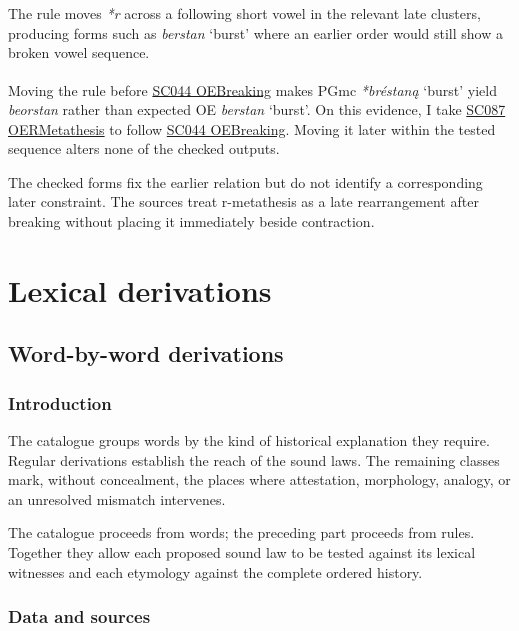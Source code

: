 \documentclass[
  british,
  a4paper,
  openany]{book}
\newcounter{none} %
\providecommand{\Pred}[1]{\textsuperscript{\dag}\emph{#1}}
\providecommand{\Recon}[1]{\emph{*#1}}
{\catcode`→=\active \global\def→{\ensuremath{\rightarrow}}}
\providecommand{\Pred}[1]{\textsuperscript{\dag}\emph{#1}}
\providecommand{\Recon}[1]{\emph{*#1}}
{\catcode`→=\active \global\def→{\ensuremath{\rightarrow}}}
\begin{document}
The rule moves \emph{*r} across a following short vowel in the relevant
late clusters, producing forms such as \emph{berstan} `burst' where an
earlier order would still show a broken vowel sequence.

Moving the rule before \hyperref[rule-OEBreaking]{SC044 OEBreaking}
makes PGmc \Recon{bréstaną} `burst' yield \Pred{beorstan} rather than
expected OE \emph{berstan} `burst'. On this evidence, I take
\hyperref[rule-OERMetathesis]{SC087 OERMetathesis} to follow
\hyperref[rule-OEBreaking]{SC044 OEBreaking}. Moving it later within the
tested sequence alters none of the checked outputs.

The checked forms fix the earlier relation but do not identify a
corresponding later constraint. The sources treat r-metathesis as a late
rearrangement after breaking without placing it immediately beside
contraction.

\newpage

\part{Lexical derivations}

\chapter*{Word-by-word derivations}\label{word-by-word-derivations}

\section*{Introduction}\label{introduction-1}

The catalogue groups words by the kind of historical explanation they
require. Regular derivations establish the reach of the sound laws. The
remaining classes mark, without concealment, the places where
attestation, morphology, analogy, or an unresolved mismatch intervenes.

The catalogue proceeds from words; the preceding part proceeds from
rules. Together they allow each proposed sound law to be tested against
its lexical witnesses and each etymology against the complete ordered
history.

\section*{Data and sources}\label{data-and-sources}
\end{document}
